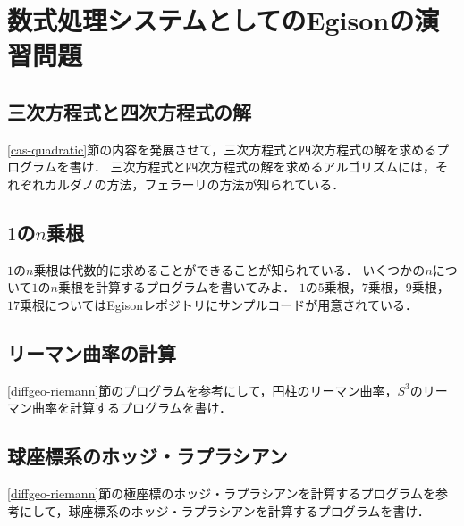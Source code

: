 \chapter{数式処理システムとしてのEgisonの演習問題}

\section*{三次方程式と四次方程式の解}

\ref{cas-quadratic}節の内容を発展させて，三次方程式と四次方程式の解を求めるプログラムを書け．
三次方程式と四次方程式の解を求めるアルゴリズムには，それぞれカルダノの方法，フェラーリの方法が知られている．

\section*{$1$の$n$乗根}

$1$の$n$乗根は代数的に求めることができることが知られている．
いくつかの$n$について$1$の$n$乗根を計算するプログラムを書いてみよ．
$1$の$5$乗根，$7$乗根，$9$乗根，$17$乗根についてはEgisonレポジトリにサンプルコードが用意されている．

\section*{リーマン曲率の計算}

\ref{diffgeo-riemann}節のプログラムを参考にして，円柱のリーマン曲率，$S^3$のリーマン曲率を計算するプログラムを書け．

\section*{球座標系のホッジ・ラプラシアン}

\ref{diffgeo-riemann}節の極座標のホッジ・ラプラシアンを計算するプログラムを参考にして，球座標系のホッジ・ラプラシアンを計算するプログラムを書け．
